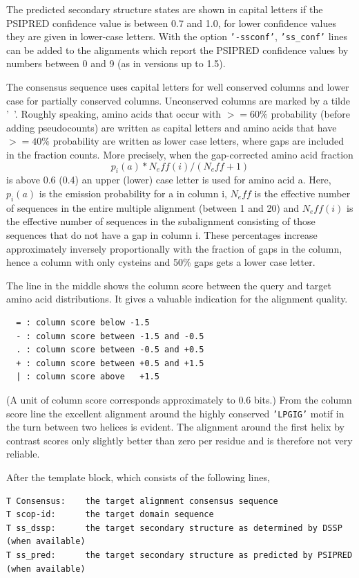 \documentclass[11pt,a4paper]{article}
\begin{document}
The predicted secondary structure states are shown in capital letters if the PSIPRED
confidence value is between 0.7 and 1.0, for lower confidence values they are given 
in lower-case letters. With the option {\tt '-ssconf'}, {\tt 'ss\_conf'} lines can 
be added to the alignments which report the PSIPRED confidence values by numbers 
between 0 and 9 (as in versions up to 1.5).

The consensus sequence uses capital letters for well conserved columns and
lower case for partially conserved columns. Unconserved columns are marked by 
a tilde '~'. Roughly speaking, amino acids that occur with $>=60\%$ probability 
(before adding pseudocounts) are written as capital letters and amino acids that have 
$>=40\%$ probability are written as lower case letters, where gaps are included
in the fraction counts. More precisely, when the gap-corrected amino acid fraction
    \[p_i(a)*N_eff(i)/(N_eff+1)\]
is above 0.6 (0.4) an upper (lower) case letter is used for amino acid a.
Here, $p_i(a)$ is the emission probability for a in column i, $N_eff$ is the effective 
number of sequences in the entire multiple alignment (between 1 and 20) and $N_eff(i)$ is 
the effective number of sequences in the subalignment consisting of those sequences
that do not have a gap in column i. These percentages increase
approximately inversely proportionally with the fraction of gaps in the column, 
hence a column with only cysteins and 50\% gaps gets a lower case letter.
              
The line in the middle shows the column score between the query and target 
amino acid distributions. It gives a valuable indication for the alignment quality.
\small\begin{verbatim}
  = : column score below -1.5
  - : column score between -1.5 and -0.5
  . : column score between -0.5 and +0.5
  + : column score between +0.5 and +1.5
  | : column score above   +1.5
\end{verbatim}\normalsize

(A unit of column score corresponds approximately to 0.6 bits.)
From the column score line the excellent alignment around the highly conserved 
{\tt 'LPGIG'} motif in the turn between two helices is evident. The alignment around the 
first helix by contrast scores only slightly better than zero per residue and is
therefore not very reliable.

After the template block, which consists of the following lines, 
\small\begin{verbatim}
T Consensus:    the target alignment consensus sequence
T scop-id:      the target domain sequence
T ss_dssp:      the target secondary structure as determined by DSSP (when available)
T ss_pred:      the target secondary structure as predicted by PSIPRED (when available)
\end{verbatim}\normalsize
\end{document}
